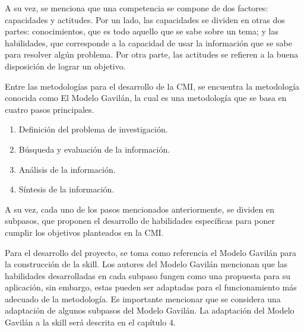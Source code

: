 A su vez, se menciona que una competencia se compone de dos factores: capacidades y actitudes. Por un lado, las capacidades se dividen en otras dos partes: conocimientos, que es todo aquello que se sabe sobre un tema; y las habilidades, que corresponde a la capacidad de usar la información que se sabe para resolver algún problema. Por otra parte, las actitudes se refieren a la buena disposición de lograr un objetivo.

Entre las metodologías para el desarrollo de la CMI, se encuentra la metodología conocida como El Modelo Gavilán, la cual es una metodología que se basa en cuatro pasos principales.

\begin{enumerate}
  \item Definición del problema de investigación.
  \item Búsqueda y evaluación de la información.
  \item Análisis de la información.
  \item Síntesis de la información.
\end{enumerate}

A su vez, cada uno de los pasos mencionados anteriormente, se dividen en subpasos, que proponen el desarrollo de habilidades específicas para poner cumplir los objetivos planteados en la CMI.

Para el desarrollo del proyecto, se toma como referencia el Modelo Gavilán para la construcción de la skill. Los autores del Modelo Gavilán mencionan que las habilidades desarrolladas en cada subpaso fungen como una propuesta para su aplicación, sin embargo, estas pueden ser adaptadas para el funcionamiento más adecuado de la metodología. Es importante mencionar que se considera una adaptación de algunos subpasos del Modelo Gavilán. La adaptación del Modelo Gavilán a la skill será descrita en el capítulo 4.
